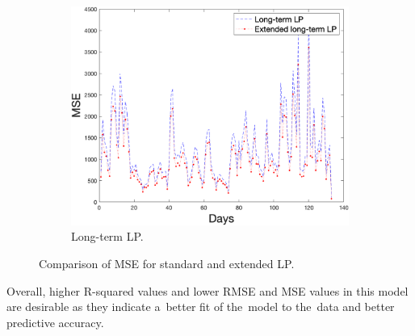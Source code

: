 \begin{figure}[!ht]
\begin{subfigure}[b]{0.4\textwidth}
            \includegraphics[width=1\textwidth]{figures/mseLLP.png}
            \caption{Long-term LP.}
            \label{fig:ltlpmse}
        \end{subfigure}
        \caption{Comparison of MSE for standard and extended LP.}
        \label{fig:shortresult}
    \end{figure}
    Overall, higher R-squared values and lower RMSE and MSE values in this model are
    desirable as they indicate a~better fit of the~model to the~data and better predictive accuracy.
    
